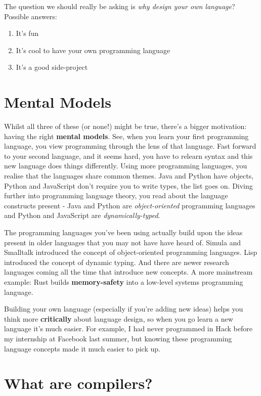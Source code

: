 The question we should really be asking is \emph{why design your own
language}? Possible answers:

\begin{enumerate}
\tightlist
\item
  It's fun
\item
  It's cool to have your own programming language
\item
  It's a good side-project
\end{enumerate}

\hypertarget{mental-models}{%
\section{\texorpdfstring{\protect\hyperlink{mental-models}{}Mental
Models}{Mental Models}}\label{mental-models}}

Whilst all three of these (or none!) might be true, there's a bigger
motivation: having the right \textbf{mental models}. See, when you learn
your first programming language, you view programming through the lens
of that language. Fast forward to your second language, and it seems
hard, you have to relearn syntax and this new language does things
differently. Using more programming languages, you realise that the
languages share common themes. Java and Python have objects, Python and
JavaScript don't require you to write types, the list goes on. Diving
further into programming language theory, you read about the language
constructs present - Java and Python are \emph{object-oriented}
programming languages and Python and JavaScript are
\emph{dynamically-typed}.

The programming languages you've been using actually build upon the
ideas present in older languages that you may not have have heard of.
Simula and Smalltalk introduced the concept of object-oriented
programming languages. Lisp introduced the concept of dynamic typing.
And there are newer research languages coming all the time that
introduce new concepts. A more mainstream example: Rust builds
\textbf{memory-safety} into a low-level systems programming language.

Building your own language (especially if you're adding new ideas) helps
you think more \textbf{critically} about language design, so when you go
learn a new language it's much easier. For example, I had never
programmed in Hack before my internship at Facebook last summer, but
knowing these programming language concepts made it much easier to pick
up.

\hypertarget{what-are-compilers}{%
\section{\texorpdfstring{\protect\hyperlink{what-are-compilers}{}What
are compilers?}{What are compilers?}}\label{what-are-compilers}}

